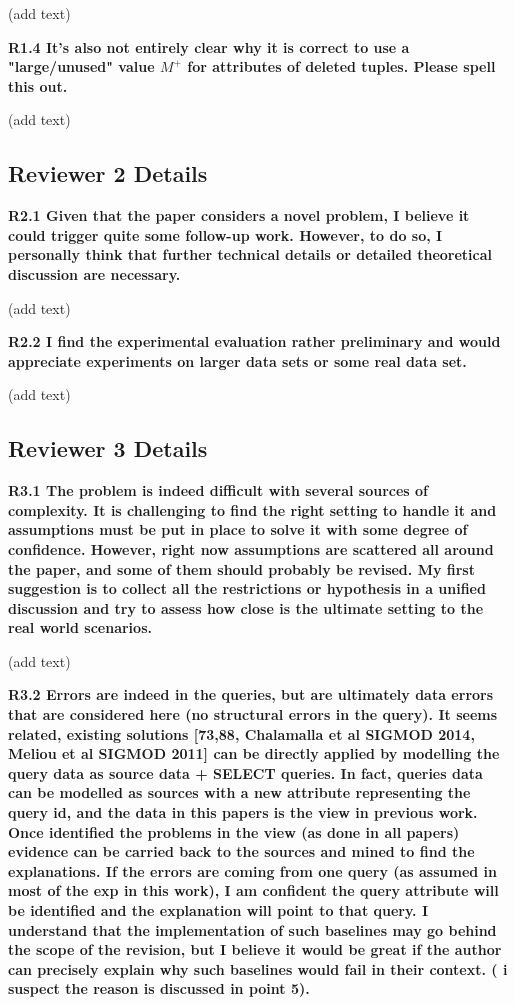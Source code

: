 \documentclass{vldb}
\newcounter{prob}
\begin{document}
(add text)

\noindent \textbf{R1.4 It's also not entirely clear why it is correct to use a "large/unused" value $M^+$ for attributes of deleted tuples. Please spell this out.}

(add text)
\subsection*{Reviewer 2 Details}
\noindent \textbf{R2.1 Given that the paper considers a novel problem, I believe it could trigger quite some follow-up work. However, to do so, I personally think that further technical details or detailed theoretical discussion are necessary. }

(add text)

\noindent \textbf{R2.2 I find the experimental evaluation rather preliminary and would appreciate experiments on larger data sets or some real data set.}

(add text)
\subsection*{Reviewer 3 Details}

\noindent \textbf{R3.1 The problem is indeed difficult with several sources of complexity. It is challenging to find the right setting to handle it and assumptions must be put in place to solve it with some degree of confidence. However, right now assumptions are scattered all around the paper, and some of them should probably be revised.
My first suggestion is to collect all the restrictions or hypothesis in a unified discussion and try to assess how close is the ultimate setting to the real world scenarios.} 

(add text)

\noindent \textbf{R3.2 Errors are indeed in the queries, but are ultimately data errors that are considered here (no structural errors in the query). It seems related, existing solutions [73,88, Chalamalla et al SIGMOD 2014, Meliou et al SIGMOD 2011] can be directly applied by modelling the query data as source data + SELECT queries. In fact, queries data can be modelled as sources with a new attribute representing the query id, and the data in this papers is the view in previous work. Once identified the problems in the view (as done in all papers) evidence can be carried back to the sources and mined to find the explanations. If the errors are coming from one query (as assumed in most of the exp in this work), I am confident the query attribute will be identified and the explanation will point to that query. I understand that the implementation of such baselines may go behind the scope of the revision, but I believe it would be great if the author can precisely explain why such baselines would fail in their context. ( i suspect the reason is discussed in point 5). }
\end{document}
